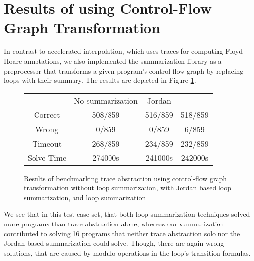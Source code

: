 \section{Results of using Control-Flow Graph Transformation}
In contrast to accelerated interpolation, which uses traces for computing Floyd-Hoare annotations, we also implemented the \qvasr summarization library as a preprocessor that transforms a given program's control-flow graph by replacing loops with their summary. The results are depicted in Figure \ref{table_tff}.
\begin{figure}[H]
	\centering
	\begin{tabular}{cccc}
		\toprule
		& No summarization & Jordan & \qvasr \\
		\cmidrule{1-4}
		Correct & 508/859 & 516/859 & 518/859 \\
		Wrong & 0/859 & 0/859 & 6/859 \\
		Timeout & 268/859 & 234/859 & 232/859 \\
		Solve Time &  274000s & 241000s & 242000s
	\end{tabular}
	\caption{Results of benchmarking trace abstraction using control-flow graph transformation without loop summarization, with Jordan based loop summarization, and \qvasr loop summarization}
	\label{table_tff}
\end{figure}
We see that in this test case set, that both loop summarization techniques solved more programs than trace abstraction alone, whereas our \qvasr summarization contributed to solving 16 programs that neither trace abstraction solo nor the Jordan based summarization could solve. Though, there are again wrong solutions, that are caused by modulo operations in the loop's transition formulas. \par 